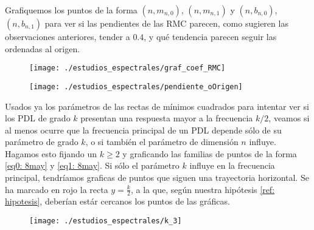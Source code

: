 Grafiquemos los puntos de la forma
$(n, m_{n,0})$, $(n, m_{n,1})$ y 
$(n, b_{n,0})$, $(n, b_{n,1})$ 
para ver si las pendientes de las RMC parecen, como
sugieren las observaciones anteriores, tender a $0.4$,
y qué tendencia parecen seguir las ordenadas al origen.
\begin{figure}[H]
	\centering
	\texttt{[image: ./estudios\_espectrales/graf\_coef\_RMC]} 
\end{figure}	

\begin{figure}[H]
	\centering
	\texttt{[image: ./estudios\_espectrales/pendiente\_oOrigen]} 
\end{figure}	


Usados ya los parámetros de las rectas
de mínimos cuadrados para
intentar ver si los PDL
de grado $k$ presentan una respuesta
mayor a la frecuencia $k/2$, veamos si al menos
ocurre que la frecuencia principal de
un PDL depende sólo de su parámetro de 
grado $k$, o si también el parámetro
de dimensión $n$ influye. 
Hagamos esto 
fijando un $k \geq 2$ y 
graficando las familias de puntos de la forma
\eqref{eq0: 8may}
y \eqref{eq1: 8may}. Si sólo el parámetro $k$ 
influye en la frecuencia principal, tendríamos graficas
de puntos que siguen una trayectoria horizontal.
Se ha marcado en rojo la recta
$y = \frac{k}{2}$, a la que, según nuestra hipótesis
\ref{ref: hipotesis}, deberían estár cercanos los
puntos de las gráficas. 

\begin{figure}[H]
	\sidecaption{
	\label{fig: k 3}
	}
	\centering
	\texttt{[image: ./estudios\_espectrales/k\_3]} 
\end{figure}

